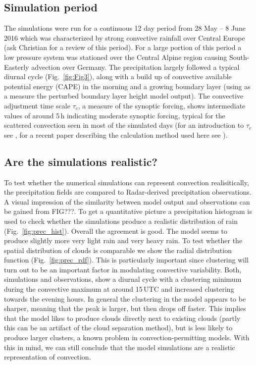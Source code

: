 \documentclass[a4paper, 12pt]{article}
\begin{document}
\subsection{Simulation period}
The simulations were run for a continuous 12 day period from 28 May -- 8 June 2016 which was characterized by strong convective rainfall over Central Europe (ask Christian for a review of this period). For a large portion of this period a low pressure system was stationed over the Central Alpine region causing South-Easterly advection over Germany. The precipitation largely followed a typical diurnal cycle (Fig.~\ref{fig:Fig3}), along with a build up of convective available potential energy (CAPE) in the morning and a growing boundary layer (using as a measure the perturbed boundary layer height model output). The convective adjustment time scale $\tau_c$, a measure of the synoptic forcing, shows intermediate values of around 5\,h indicating moderate synoptic forcing, typical for the scattered convection seen in most of the simulated days (for an introduction to $\tau_c$ see \cite{Done2006}, for a recent paper describing the calculation method used here see \cite{Flack2016}).

\subsection{Are the simulations realistic?} 
To test whether the numerical simulations can represent convection realisitically, the precipitation fields are compared to Radar-derived precipitation observations. A visual impression of the similarity between model output and observations can be gained from FIG???. To get a quantitative picture a precipitation histogram is used to check whether the simulations produce a realistic distribution of rain (Fig.~\ref{fig:prec_hist}). Overall the agreement is good. The model seems to produce slightly more very light rain and very heavy rain. To test whether the spatial distribution of clouds is comparable we show the radial distribution function (Fig.~\ref{fig:prec_rdf}). This is particularly important since clustering will turn out to be an important factor in modulating convective variability. Both, simulations and observations, show a diurnal cycle with a clustering minimum during the convective maximum at around 15\,UTC and increased clustering towards the evening hours. In general the clustering in the model appears to be sharper, meaning that the peak is larger, but then drops off faster. This implies that the model likes to produce clouds directly next to existing clouds (partly this can be an artifact of the cloud separation method), but is less likely to produce larger clusters, a known problem in convection-permitting models. With this in mind, we can still conclude that the model simulations are a realistic representation of convection. 
\end{document}
